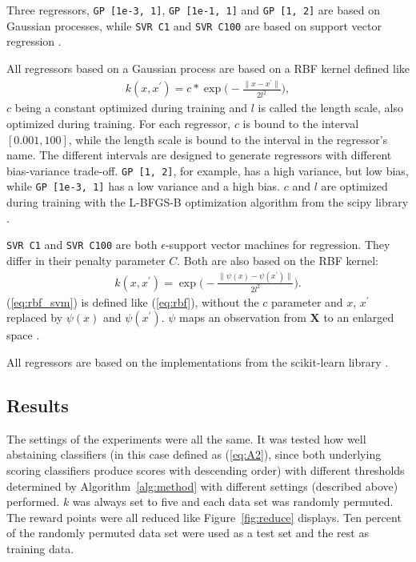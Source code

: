 \documentclass[twoside,11pt]{article}
\def\X{\textbf{X}}
\begin{document}
Three regressors, \texttt{GP [1e-3, 1]},
\texttt{GP [1e-1, 1]} and \texttt{GP [1, 2]} are based on
Gaussian processes, while \texttt{SVR C1} and
\texttt{SVR C100} are based on support vector regression
\citep[see e.g.][Chapters 14, 15]{murphy_2012}.

All regressors based on a Gaussian process are based on
a RBF kernel defined like
\begin{align}
  \label{eq:rbf}
  k(x, x^\prime) = c * \exp \bigg(
    -\frac{\| x - x^\prime \|}{2l^2} \bigg),
\end{align}
$c$ being a constant optimized during training and $l$ is
called the length scale, also optimized during training.
For each regressor, $c$ is bound to the interval
$[0.001, 100]$, while the length scale is bound to the
interval in the regressor's name.
The different intervals are designed to generate regressors
with different bias-variance trade-off.
\texttt{GP [1, 2]}, for example, has a high variance, but
low bias, while \texttt{GP [1e-3, 1]} has a low variance
and a high bias.
$c$ and $l$ are optimized during training with the
L-BFGS-B optimization algorithm from the scipy library
\citep[see][]{zhu_et_al_1997, scipy}.

\texttt{SVR C1} and \texttt{SVR C100} are both
$\epsilon$-support vector machines for regression.
They differ in their penalty parameter $C$.
Both are also based on the RBF kernel:
\begin{align}
  \label{eq:rbf_svm}
  k(x, x^\prime) = \exp \bigg(
    -\frac{\| \psi(x) - \psi(x^\prime) \|}{2l^2} \bigg).
\end{align}
(\ref{eq:rbf_svm}) is defined like (\ref{eq:rbf}),
without the $c$ parameter and $x$, $x^\prime$ replaced by
$\psi(x)$ and $\psi(x^\prime)$.
$\psi$ maps an observation from $\X$ to an enlarged space
\citep[see][Chapter 12.3]{hastie_et_al_2009}.

All regressors are based on the implementations from
the scikit-learn library \citep[see][]{sklearn_api}.


\subsection{Results}

The settings of the experiments were all the same.
It was tested how well abstaining classifiers (in this
case defined as (\ref{eq:A2}), since both underlying
scoring classifiers produce scores with descending order)
with different thresholds determined by
Algorithm~\ref{alg:method} with different settings
(described above) performed. $k$ was always set to five and
each data set was randomly permuted.
The reward points were all reduced like
Figure~\ref{fig:reduce} displays.
Ten percent of the randomly permuted data set were used as
a test set and the rest as training data.
\end{document}
